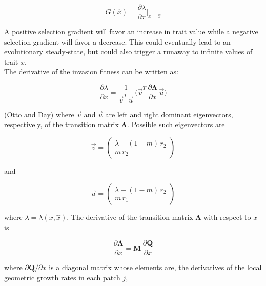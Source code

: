 \begin{equation}
    G(\hat{x}) = \frac{\partial \lambda}{\partial x}\bigg|_{x=\hat{x}}
\end{equation}

A positive selection gradient will favor an increase in trait value while a negative selection gradient will favor a decrease. This could eventually lead to an evolutionary steady-state, but could also trigger a runaway to infinite values of trait $x$.\\

The derivative of the invasion fitness can be written as:

\begin{equation}
   \frac{\partial \lambda}{\partial x}\bigg = \frac{1}{\overrightarrow{v}^T\,\overrightarrow{u}} \, \bigg( \overrightarrow{v}^T \, \frac{\partial \pmb{\Lambda}}{\partial x} \, \overrightarrow{u} \bigg)
   \label{eq:deriv_fitness}
\end{equation}

(Otto and Day) where $\overrightarrow{v}$ and $\overrightarrow{u}$ are left and right dominant eigenvectors, respectively, of the transition matrix $\pmb{\Lambda}$. Possible such eigenvectors are

\begin{equation}
    \overrightarrow{v} = 
    \begin{pmatrix}
        \lambda - (1-m)\,r_2 \\
        m\,r_2 
    \end{pmatrix}
    \label{eq:left_eigenvector}
\end{equation}

and

\begin{equation}
    \overrightarrow{u} = 
    \begin{pmatrix}
        \lambda - (1-m)\,r_2 \\
        m\,r_1
    \end{pmatrix}
\end{equation}

where $\lambda = \lambda(x, \hat x)$. The derivative of the transition matrix $\pmb\Lambda$ with respect to $x$ is

\begin{equation}
    \frac{\partial \pmb{\Lambda}}{\partial x} = \pmb{M} \, \frac{\partial \pmb{Q}}{\partial x}
\end{equation}

where $\partial \pmb{Q} / \partial x$ is a diagonal matrix whose elements are, the derivatives of the local geometric growth rates in each patch $j$,

